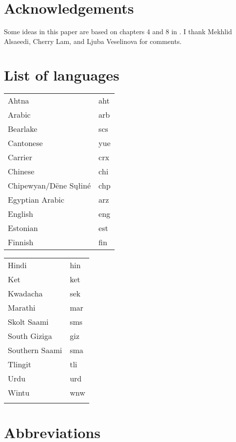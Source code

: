 \documentclass[output=paper,draft,draftmode,colorlinks,citecolor=brown]{langscibook}
\begin{document}
\section*{Acknowledgements}\label{sec:oth-acknowledgements}

Some ideas in this paper are based on chapters 4 and 8 in
\textcite{Gelderen2011}. I thank Mekhlid Alsaeedi, Cherry Lam, and Ljuba
Veselinova for comments.


\section*{List of languages}

\begin{tabularx}{.5\textwidth}{@{}lQ}
Ahtna           &aht\\
Arabic          &arb \\
Bearlake        &scs \\
Cantonese       &yue \\
Carrier         &crx \\
Chinese         &chi \\
Chipewyan\slash Dëne S\k{u}łiné  &chp\\
Egyptian Arabic    &arz\\
English         &eng\\
Estonian        &est \\
Finnish         &fin\\
\end{tabularx}\begin{tabularx}{.5\textwidth}{lQ@{}}
Hindi           &hin\\
Ket             &ket\\
Kwadacha        &sek\\
Marathi         &mar\\
Skolt Saami     &sms\\
South Giziga    &giz\\
Southern Saami    &sma\\
Tlingit         &tli\\
Urdu            &urd\\
Wintu           &wnw\\
\\
\end{tabularx}

\section*{Abbreviations}
\end{document}
